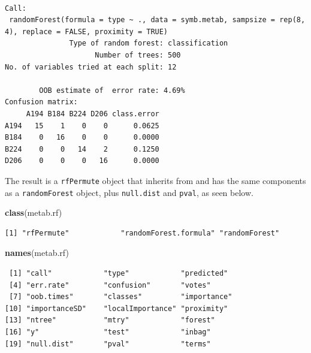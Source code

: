 \documentclass[]{article}
\newenvironment{Shaded}{\begin{snugshade}}{\end{snugshade}}
\newcommand{\KeywordTok}[1]{\textcolor[rgb]{0.13,0.29,0.53}{\textbf{{#1}}}}
\newcommand{\NormalTok}[1]{{#1}}
\begin{document}
\begin{verbatim}

Call:
 randomForest(formula = type ~ ., data = symb.metab, sampsize = rep(8,      4), replace = FALSE, proximity = TRUE) 
               Type of random forest: classification
                     Number of trees: 500
No. of variables tried at each split: 12

        OOB estimate of  error rate: 4.69%
Confusion matrix:
     A194 B184 B224 D206 class.error
A194   15    1    0    0      0.0625
B184    0   16    0    0      0.0000
B224    0    0   14    2      0.1250
D206    0    0    0   16      0.0000
\end{verbatim}

The result is a \texttt{rfPermute} object that inherits from and has the
same components as a \texttt{randomForest} object, plus
\texttt{null.dist} and \texttt{pval}, as seen below.

\begin{Shaded}
\begin{Highlighting}[]
\KeywordTok{class}\NormalTok{(metab.rf)}
\end{Highlighting}
\end{Shaded}

\begin{verbatim}
[1] "rfPermute"            "randomForest.formula" "randomForest"        
\end{verbatim}

\begin{Shaded}
\begin{Highlighting}[]
\KeywordTok{names}\NormalTok{(metab.rf)}
\end{Highlighting}
\end{Shaded}

\begin{verbatim}
 [1] "call"            "type"            "predicted"      
 [4] "err.rate"        "confusion"       "votes"          
 [7] "oob.times"       "classes"         "importance"     
[10] "importanceSD"    "localImportance" "proximity"      
[13] "ntree"           "mtry"            "forest"         
[16] "y"               "test"            "inbag"          
[19] "null.dist"       "pval"            "terms"          
\end{verbatim}

\begin{Shaded}
\end{Shaded}
\end{document}
